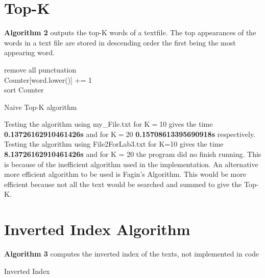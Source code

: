 \documentclass[11pt]{IEEEtran}
\begin{document}
\section{Top-K}

\noindent
\textbf{Algorithm 2} outputs the top-K words of a textfile. The top appearances of the words in a text file are stored in descending order the first being the most appearing word. 

\begin{algorithm}[H]
 {  
    remove all punctuation\\
    Counter[word.lower()] += 1\\
    sort Counter\\
 }
 {  
    
 }
 \caption{Naive Top-K algorithm}
 
\end{algorithm}

Testing the algorithm using my\_File.txt for K$=$10 gives the time \textbf{0.13726162910461426s}
and for K$=$20 \textbf{0.15708613395690918s} respectively.
Testing the algorithm using File2ForLab3.txt for K=10 gives the time \textbf{8.13726162910461426s}
and for K = 20 the program did no finish running. This is because of the inefficient algorithm used in the implementation. An alternative more efficient algorithm to be used is Fagin's Algorithm. This would be more efficient because not all the text would be searched and summed to give the Top-K.



\section{Inverted Index Algorithm}
\noindent
\textbf{Algorithm 3} computes the inverted index of the texts, not implemented in code

\begin{algorithm}[H]
  
 {
 }
 {
 }
 
 \caption{Inverted Index}
\end{algorithm}
\end{document}
